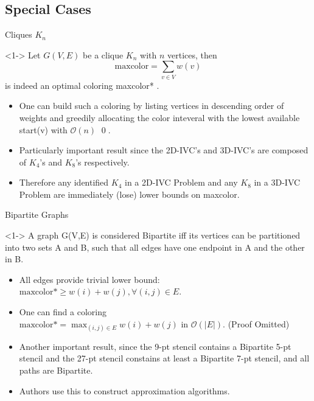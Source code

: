 \subsection{Special Cases}

\begin{frame}{Cliques $K_n$}
  \begin{theorem}<1->
    Let $G(V,E)$ be a clique $K_n$ with $n$ vertices, then  \[ \text{maxcolor}= \sum_{v \in V} w(v) \]
    is indeed an optimal coloring maxcolor* .
  \end{theorem}

  \begin{itemize}
    \item<2-> One can build such a coloring by listing vertices in descending order of weights and
    greedily allocating the color inteveral with the lowest available start(v) with $\mathcal{O}(n)$ \qed .

    \item<3-> Particularly important result since the 2D-IVC's and 3D-IVC's are composed of $K_4$'s and $K_8$'s
    respectively.

    \item<4-> Therefore any identified $K_4$ in a 2D-IVC Problem and any $K_8$ in a 3D-IVC Problem are immediately
    (lose) lower bounds on maxcolor.
  \end{itemize}
\end{frame}

\begin{frame}{Bipartite Graphs}
  \begin{definition}<1->
    A graph G(V,E) is considered Bipartite iff its vertices can be partitioned into
    two sets A and B, such that all edges have one endpoint in A and the other in B.
  \end{definition}

  \begin{itemize}
    \item<2-> All edges provide trivial lower bound: $ \text{maxcolor*} \ge  w(i) + w(j), \forall (i, j) \in E.$
    \item<3-> One can find a coloring \\ 
    $\text{maxcolor*} = \max_{(i,j) \in E} w(i) + w(j)$ in $\mathcal{O}(|E|)$. (Proof Omitted)
    \item<4-> Another important result, since the 9-pt stencil contains a Bipartite 5-pt stencil and the
    27-pt stencil constains at least a Bipartite 7-pt stencil, and all paths are Bipartite.
    \item<5-> Authors use this to construct approximation algorithms.
  \end{itemize}
\end{frame}

